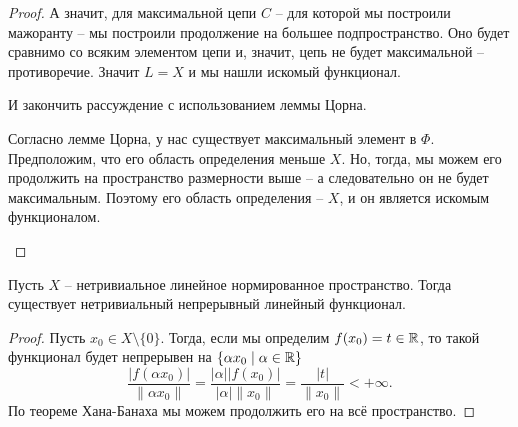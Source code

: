 \begin{proof}
    А значит, для максимальной цепи $C$ -- для которой мы построили мажоранту -- мы построили продолжение на большее подпространство.
    Оно будет сравнимо со всяким элементом цепи и, значит, цепь не будет максимальной -- противоречие.
    Значит $L = X$ и мы нашли искомый функционал.

    \begin{notet}
        И закончить рассуждение с использованием леммы Цорна.

        Согласно лемме Цорна, у нас существует максимальный элемент в $\Phi$.
        Предположим, что его область определения меньше $X$.
        Но, тогда, мы можем его продолжить на пространство размерности выше -- а следовательно он не будет максимальным.
        Поэтому его область определения -- $X$, и он является искомым функционалом.
    \end{notet}

\end{proof}


\begin{corollary}
    Пусть $X$ -- нетривиальное линейное нормированное пространство.
    Тогда существует нетривиальный непрерывный линейный функционал.
\end{corollary}
\begin{proof}
    Пусть $x_0 \in X \setminus \{0\}$.
    Тогда, если мы определим $f(x_0) = t \in \mathbb{R}$, то такой функционал будет непрерывен на $\{\alpha x_0 \mid \alpha \in \mathbb{R}\}$
    \[
        \frac{|f(\alpha x_0)|}{\|\alpha x_0\|} = \frac{|\alpha||f(x_0)|}{|\alpha|\|x_0\|} = \frac{|t|}{\|x_0\|} < +\infty.
    \]
    По теореме Хана-Банаха мы можем продолжить его на всё пространство.
\end{proof}

